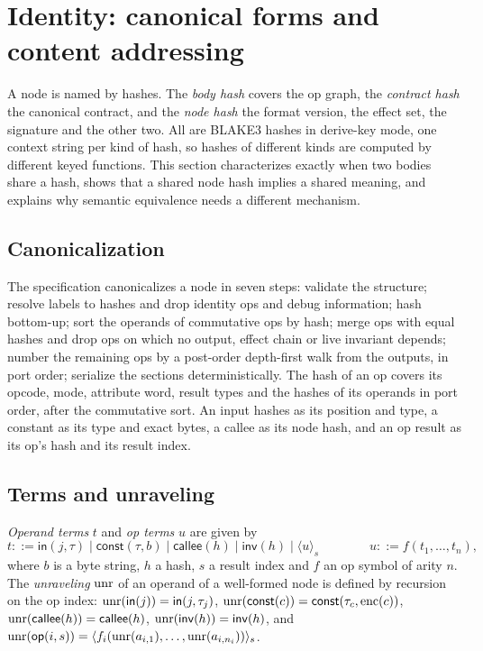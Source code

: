 \section{Identity: canonical forms and content addressing}\label{sec:identity}

A \VG{} node is named by hashes. The \emph{body hash} covers the op graph, the \emph{contract
hash} the canonical contract, and the \emph{node hash} the format version, the effect set,
the signature and the other two. All are BLAKE3 hashes in derive-key mode, one context string
per kind of hash, so hashes of different kinds are computed by different keyed functions. This
section characterizes exactly when two bodies share a hash, shows that a shared node hash
implies a shared meaning, and explains why semantic equivalence needs a different mechanism.

\subsection{Canonicalization}

The specification canonicalizes a node in seven steps: validate the structure; resolve labels
to hashes and drop identity ops and debug information; hash bottom-up; sort the operands of
commutative ops by hash; merge ops with equal hashes and drop ops on which no output, effect
chain or live invariant depends; number the remaining ops by a post-order depth-first walk
from the outputs, in port order; serialize the sections deterministically. The hash of an op
covers its opcode, mode, attribute word, result types and the hashes of its operands in port
order, after the commutative sort. An input hashes as its position and type, a constant as its
type and exact bytes, a callee as its node hash, and an op result as its op's hash and its
result index.

\subsection{Terms and unraveling}

\begin{definition}[Terms]\label{def:terms}
\emph{Operand terms} $t$ and \emph{op terms} $u$ are given by
\[
t ::= \mathsf{in}(j,\tau) \mid \mathsf{const}(\tau,b) \mid \mathsf{callee}(h) \mid
      \mathsf{inv}(h) \mid \langle u\rangle_s
\qquad\qquad
u ::= f(t_1,\dots,t_n),
\]
where $b$ is a byte string, $h$ a hash, $s$ a result index and $f$ an op symbol of arity $n$.
The \emph{unraveling} $\mathrm{unr}$ of an operand of a well-formed node is defined by recursion on the
op index: $\mathrm{unr}(\mathsf{in}(j))=\mathsf{in}(j,\tau_j)$,
$\mathrm{unr}(\mathsf{const}(c))=\mathsf{const}(\tau_c,\mathrm{enc}(c))$,
$\mathrm{unr}(\mathsf{callee}(h))=\mathsf{callee}(h)$, $\mathrm{unr}(\mathsf{inv}(h))=\mathsf{inv}(h)$, and
$\mathrm{unr}(\mathsf{op}(i,s))=\langle f_i(\mathrm{unr}(a_{i,1}),\dots,\mathrm{unr}(a_{i,n_i}))\rangle_s$.
\end{definition}

